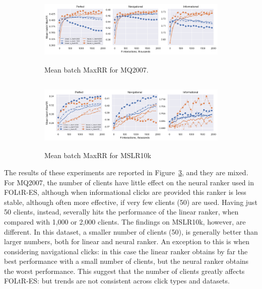 \begin{figure}[t]
	\centering
	\begin{subfigure}{1\textwidth}
		\includegraphics[width=13cm, height=3.5cm]{images/RQ2/mq2007_foltr_client_both_p0.9.png}
		\caption{Mean batch MaxRR for MQ2007.}
		\label{fig:mq2007-rq2}
	\end{subfigure}
	\begin{subfigure}{1\textwidth}
		\includegraphics[width=13cm, height=3.5cm]{images/RQ2/mslr10k_foltr_client_both_p0.9.png}
		\caption{Mean batch MaxRR for MSLR10k}
		\label{fig:mslr10k-rq2}
	\end{subfigure}
	\caption{{\color{red}{Results for RQ2: performance of FOLtR-ES with respect to number of clients (averaged across all dataset splits).}} \label{fig:RQ2}} 
\end{figure}

The results of these experiments are reported in Figure~\ref{fig:RQ2}, and they are mixed. For MQ2007, the number of clients have little effect on the neural ranker used in FOLtR-ES, although when informational clicks are provided this ranker is less stable, although often more effective, if very few clients (50) are used. Having just 50 clients, instead, severally hits the performance of the linear ranker, when compared with 1,000 or 2,000 clients. The findings on MSLR10k, however, are different. In this dataset, a smaller number of clients (50), is generally better than larger numbers, both for linear and neural ranker. An exception to this is when considering navigational clicks: in this case the linear ranker obtains by far the best performance with a small number of clients, but the neural ranker obtains the worst performance. This suggest that the number of clients greatly affects FOLtR-ES: but trends are not consistent across click types and datasets. 

